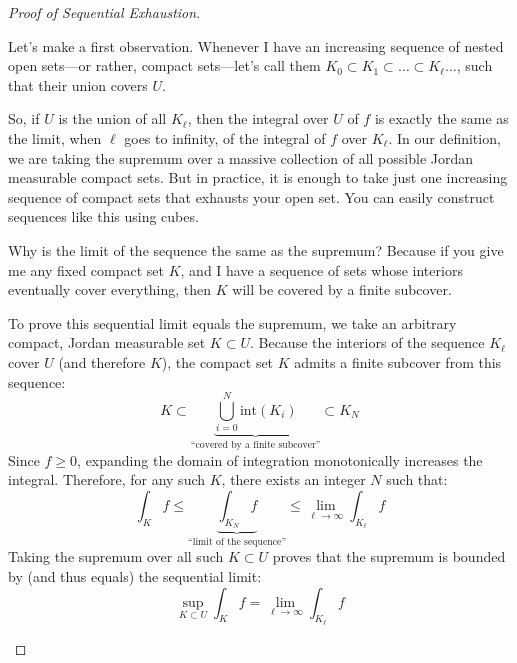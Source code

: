\begin{proof}[Proof of Sequential Exhaustion]
\begin{spoken-clean}[00:12:07 - 00:15:00]
Let's make a first observation. Whenever I have an increasing sequence of nested open sets—or rather, compact sets—let's call them $K_0 \subset K_1 \subset \dots \subset K_\ell \dots$, such that their union covers $U$. 

So, if $U$ is the union of all $K_\ell$, then the integral over $U$ of $f$ is exactly the same as the limit, when $\ell$ goes to infinity, of the integral of $f$ over $K_\ell$. In our definition, we are taking the supremum over a massive collection of all possible Jordan measurable compact sets. But in practice, it is enough to take just one increasing sequence of compact sets that exhausts your open set. You can easily construct sequences like this using cubes.

Why is the limit of the sequence the same as the supremum? Because if you give me any fixed compact set $K$, and I have a sequence of sets whose interiors eventually cover everything, then $K$ will be covered by a finite subcover.
\end{spoken-clean}

\begin{math-stroke}
To prove this sequential limit equals the supremum, we take an arbitrary compact, Jordan measurable set $K \subset U$. 
Because the interiors of the sequence $K_\ell$ cover $U$ (and therefore $K$), the compact set $K$ admits a finite subcover from this sequence:
\[
K \subset \underbrace{\bigcup_{i=0}^N \text{int}(K_i)}_{\text{``covered by a finite subcover''}} \subset K_N
\]
Since $f \ge 0$, expanding the domain of integration monotonically increases the integral. Therefore, for any such $K$, there exists an integer $N$ such that:
\[
\int_K f \le \underbrace{\int_{K_N} f}_{\text{``limit of the sequence''}} \le \lim_{\ell \to \infty} \int_{K_\ell} f
\]
Taking the supremum over all such $K \subset U$ proves that the supremum is bounded by (and thus equals) the sequential limit:
\[
\sup_{K \subset U} \int_K f = \lim_{\ell \to \infty} \int_{K_\ell} f
\]
\end{math-stroke}
\end{proof}
